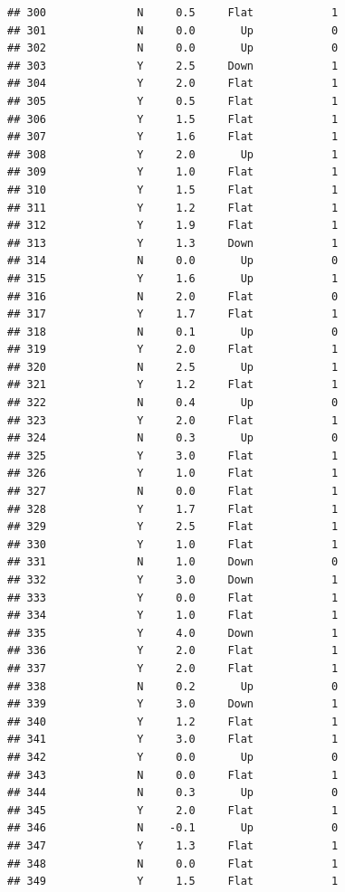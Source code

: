 \documentclass[
]{article}
\begin{document}
\begin{verbatim}
## 300              N     0.5     Flat            1
## 301              N     0.0       Up            0
## 302              N     0.0       Up            0
## 303              Y     2.5     Down            1
## 304              Y     2.0     Flat            1
## 305              Y     0.5     Flat            1
## 306              Y     1.5     Flat            1
## 307              Y     1.6     Flat            1
## 308              Y     2.0       Up            1
## 309              Y     1.0     Flat            1
## 310              Y     1.5     Flat            1
## 311              Y     1.2     Flat            1
## 312              Y     1.9     Flat            1
## 313              Y     1.3     Down            1
## 314              N     0.0       Up            0
## 315              Y     1.6       Up            1
## 316              N     2.0     Flat            0
## 317              Y     1.7     Flat            1
## 318              N     0.1       Up            0
## 319              Y     2.0     Flat            1
## 320              N     2.5       Up            1
## 321              Y     1.2     Flat            1
## 322              N     0.4       Up            0
## 323              Y     2.0     Flat            1
## 324              N     0.3       Up            0
## 325              Y     3.0     Flat            1
## 326              Y     1.0     Flat            1
## 327              N     0.0     Flat            1
## 328              Y     1.7     Flat            1
## 329              Y     2.5     Flat            1
## 330              Y     1.0     Flat            1
## 331              N     1.0     Down            0
## 332              Y     3.0     Down            1
## 333              Y     0.0     Flat            1
## 334              Y     1.0     Flat            1
## 335              Y     4.0     Down            1
## 336              Y     2.0     Flat            1
## 337              Y     2.0     Flat            1
## 338              N     0.2       Up            0
## 339              Y     3.0     Down            1
## 340              Y     1.2     Flat            1
## 341              Y     3.0     Flat            1
## 342              Y     0.0       Up            0
## 343              N     0.0     Flat            1
## 344              N     0.3       Up            0
## 345              Y     2.0     Flat            1
## 346              N    -0.1       Up            0
## 347              Y     1.3     Flat            1
## 348              N     0.0     Flat            1
## 349              Y     1.5     Flat            1

\end{verbatim}
\end{document}
